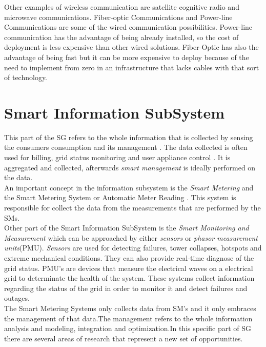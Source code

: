 Other examples of wireless communication are satellite cognitive radio and  microwave communications.
Fiber-optic Communications and Power-line Communications are some of the wired communication possibilities. Power-line communication has the advantage of being already installed, so the cost of deployment is less expensive than other wired solutions. Fiber-Optic has also the advantage of being fast  but it can be more expensive to deploy because of the need to implement from zero in an infrastructure that lacks cables with that sort of technology.\\




\section{Smart Information SubSystem}\label{sec:sginformation}
This part of the SG refers to the whole information that is collected by sensing the consumers consumption and its management . The data collected is often used for billing, grid status monitoring and user appliance control \cite{journals/comsur/FangMXY12}. It is aggregated and collected, afterwards \textit{smart management} is ideally performed on the data.\\
An important concept in the information subsystem  is the \textit{Smart Metering} and the Smart Metering System or Automatic Meter Reading . This system is responsible for collect the data from the measurements that are performed by the SMs.\\
Other part of the Smart Information SubSystem is the \textit{Smart Monitoring and Measurement} which can be approached by either \textit{sensors} or \textit{phasor measurement units}(PMU). \textit{Sensors} are used for detecting failures, tower collapses, hotspots and extreme mechanical conditions. They can also provide real-time diagnose of the grid status. PMU's are devices that measure the electrical waves on a electrical grid to determinate the health  of the system. These systems collect information regarding the status of the grid in order to monitor it and detect failures and outages.\\
 The Smart Metering Systems  only collects data from SM's and it only embraces the management of that data.The management refers to the whole information analysis and modeling, integration and optimization.In this specific part of SG there are several areas of research that represent a new set of opportunities.

